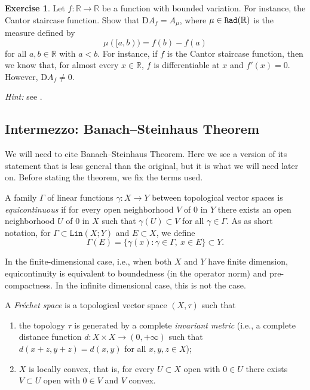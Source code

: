 \documentclass[a4paper,9pt]{amsart}
\newcommand{\R}{\mathbb{R}}	%
\newcommand{\Diff}{\mathrm{D}}
\newcommand{\Lin}{\mathtt{Lin}}
\theoremstyle{plain}
\theoremstyle{definition}
\newtheorem{exercise}[proposition]{Exercise}%
\theoremstyle{remark}
\begin{document}
\begin{exercise}
	Let $f:\R\to\R$ be a function with bounded variation.
	For instance, the Cantor staircase function.
	Show that $\Diff A_f = A_\mu$, where $\mu\in\radon(\R)$ is the measure defined by 
	\begin{equation}
		\mu([a,b)) = f(b)-f(a)
	\end{equation}
	for all $a,b\in\R$ with $a<b$.
	For instance, if $f$ is the Cantor staircase function, then we know that,
	for almost every $x\in\R$, $f$ is differentiable at $x$ and $f'(x)=0$.
	However, $\Diff A_f\neq0$.
	
	{\it Hint:} see \cite[\S6.14]{MR1157815}.
\end{exercise}

\subsection{Intermezzo: Banach--Steinhaus Theorem}\label{subs67e9629a}
We will need to cite Banach--Steinhaus Theorem. 
Here we see a version of its statement that is less general than the original, but it is what we will need later on.
Before stating the theorem, we fix the terms used.

A family $\Gamma$ of linear functions $\gamma:X\to Y$ between topological vector spaces is 
\emph{equicontinuous} if for every open neighborhood $V$ of $0$ in $Y$ there exists an open neighborhood $U$ of $0$ in $X$ such that $\gamma(U)\subset V$ for all $\gamma\in\Gamma$.
As as short notation, for $\Gamma\subset\Lin(X;Y)$ and $E\subset X$, we define
\begin{equation}
	\Gamma(E) = \{\gamma(x):\gamma\in \Gamma,\ x\in E\}\subset Y .
\end{equation}

In the finite-dimensional case, i.e., when both $X$ and $Y$ have finite dimension,
equicontinuity is equivalent to boundedness (in the operator norm) and pre-compactness.
In the infinite dimensional case, this is not the case.

A \emph{Fréchet space} is a topological vector space $(X,\tau)$ such that
\begin{enumerate}
\item	the topology $\tau$ is generated by a complete \emph{invariant metric} (i.e., a complete distance function $d:X\times X\to(0,+\infty)$ such that $d(x+z,y+z) = d(x,y)$ for all $x,y,z\in X$);
\item	$X$ is locally convex, that is, for every $U\subset X$ open with $0\in U$ there exists $V\subset U$ open with $0\in V$ and $V$ convex.
\end{enumerate}
\end{document}

